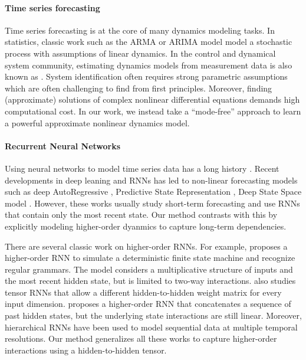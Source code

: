 \paragraph{Time series forecasting}
Time series forecasting is at the core of many dynamics modeling tasks. In statistics, classic work  such as the ARMA or ARIMA model \citep{box2015time}  model a stochastic process with assumptions of linear dynamics. In the control and dynamical system community, estimating dynamics  models from measurement data is also known as  \citep{ljung2001system}.  System identification often requires strong parametric assumptions which are often challenging to find from first principles.  Moreover, finding (approximate) solutions of complex nonlinear differential equations demands high computational cost. In our work, we instead take a ``mode-free'' approach to learn a powerful approximate nonlinear dynamics model.



\paragraph{Recurrent Neural Networks}
Using neural networks to model time series data has a long history  \citep{schmidhuber2015deep}. Recent developments in deep leaning and RNNs has led to non-linear forecasting models such as deep AutoRegressive  \citep{flunkert2017deepar},  Predictive State Representation \citep{downey2017practical}, Deep State Space model \citep{rangapuram2018deep}. However, these works usually study short-term forecasting and use RNNs that contain only the most recent state.  Our method contrasts with this by explicitly modeling higher-order dyanmics to capture long-term dependencies.
 


There are several classic work on higher-order RNNs. For example, \citep{giles1989higher} proposes a higher-order RNN to simulate a deterministic finite state machine and recognize regular grammars. The model considers a multiplicative structure of inputs and the most recent hidden state, but is limited to two-way interactions. \citep{sutskever2011generating} also studies tensor RNNs that allow a different hidden-to-hidden weight matrix for every input dimension.
%
\cite{soltani2016higher} proposes a higher-order RNN that concatenates a sequence of past hidden states, but the underlying state interactions are still linear. 
%
Moreover, hierarchical RNNs \citep{zheng2016generating} have been used to model sequential data at multiple temporal resolutions. Our method generalizes all these works to capture higher-order interactions using a hidden-to-hidden tensor.

